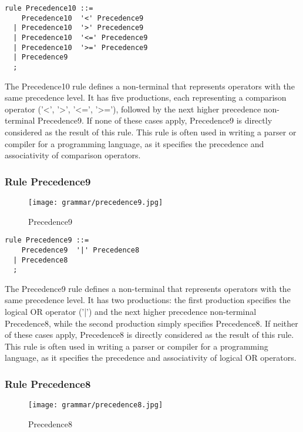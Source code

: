 \begin{lstlisting}
rule Precedence10 ::=
    Precedence10  '<' Precedence9 
  | Precedence10  '>' Precedence9 
  | Precedence10  '<=' Precedence9 
  | Precedence10  '>=' Precedence9 
  | Precedence9 
  ;
\end{lstlisting}

The Precedence10 rule defines a non-terminal that represents operators with the same precedence level. It has five productions, each representing a comparison operator ('<', '>', '<=', '>='), followed by the next higher precedence non-terminal Precedence9. If none of these cases apply, Precedence9 is directly considered as the result of this rule. This rule is often used in writing a parser or compiler for a programming language, as it specifies the precedence and associativity of comparison operators.

\subsubsection*{Rule Precedence9}

\begin{figure}[!ht]
\centering
\texttt{[image: grammar/precedence9.jpg]}
\caption{Precedence9}
\end{figure}

\begin{lstlisting}
rule Precedence9 ::=
    Precedence9  '|' Precedence8 
  | Precedence8 
  ;
\end{lstlisting}

The Precedence9 rule defines a non-terminal that represents operators with the same precedence level. It has two productions: the first production specifies the logical OR operator ('|') and the next higher precedence non-terminal Precedence8, while the second production simply specifies Precedence8. If neither of these cases apply, Precedence8 is directly considered as the result of this rule. This rule is often used in writing a parser or compiler for a programming language, as it specifies the precedence and associativity of logical OR operators.

\subsubsection*{Rule Precedence8}

\begin{figure}[!ht]
\centering
\texttt{[image: grammar/precedence8.jpg]}
\caption{Precedence8}
\end{figure}

